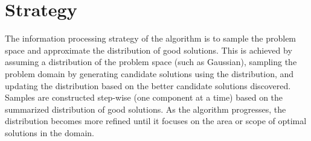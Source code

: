 \documentclass[a4paper, 11pt]{article}
\begin{document}

\section{Strategy}
\label{sec:strategy}
The information processing strategy of the algorithm is to sample the problem space and approximate the distribution of good solutions.
This is achieved by assuming a distribution of the problem space (such as Gaussian), sampling the problem domain by generating candidate solutions using the distribution, and updating the distribution based on the better candidate solutions discovered. Samples are constructed step-wise (one component at a time) based on the summarized distribution of good solutions. As the algorithm progresses, the distribution becomes more refined until it focuses on the area or scope of optimal solutions in the domain.
\end{document}
